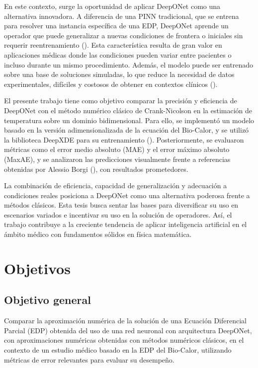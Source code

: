\documentclass[
  spanish,
  us-letterpaper,
]{scrreprt}
\theoremstyle{plain}
\theoremstyle{definition}
\theoremstyle{remark}
\begin{document}
En este contexto, surge la oportunidad de aplicar DeepONet como una
alternativa innovadora. A diferencia de una PINN tradicional, que se
entrena para resolver una instancia específica de una EDP, DeepONet
aprende un operador que puede generalizar a nuevas condiciones de
frontera o iniciales sin requerir reentrenamiento
(). Esta característica
resulta de gran valor en aplicaciones médicas donde las condiciones
pueden variar entre pacientes o incluso durante un mismo procedimiento.
Además, el modelo puede ser entrenado sobre una base de soluciones
simuladas, lo que reduce la necesidad de datos experimentales, difíciles
y costosos de obtener en contextos clínicos
().

El presente trabajo tiene como objetivo comparar la precisión y
eficiencia de DeepONet con el método numérico clásico de Crank-Nicolson
en la estimación de temperatura sobre un dominio bidimensional. Para
ello, se implementó un modelo basado en la versión adimensionalizada de
la ecuación del Bio-Calor, y se utilizó la biblioteca DeepXDE para su
entrenamiento ().
Posteriormente, se evaluaron métricas como el error medio absoluto (MAE)
y el error máximo absoluto (MaxAE), y se analizaron las predicciones
visualmente frente a referencias obtenidas por Alessio Borgi
(), con resultados prometedores.

La combinación de eficiencia, capacidad de generalización y adecuación a
condiciones reales posiciona a DeepONet como una alternativa poderosa
frente a métodos clásicos. Esta tesis busca sentar las bases para
diversificar su uso en escenarios variados e incentivar su uso en la
solución de operadores. Así, el trabajo contribuye a la creciente
tendencia de aplicar inteligencia artificial en el ámbito médico con
fundamentos sólidos en física matemática.


\chapter{Objetivos}\label{objetivos}

\section{Objetivo general}\label{objetivo-general}

Comparar la aproximación numérica de la solución de una Ecuación
Diferencial Parcial (EDP) obtenida del uso de una red neuronal con
arquitectura DeepONet, con aproximaciones numéricas obtenidas con
métodos numéricos clásicos, en el contexto de un estudio médico basado
en la EDP del Bio-Calor, utilizando métricas de error relevantes para
evaluar su desempeño.
\end{document}
